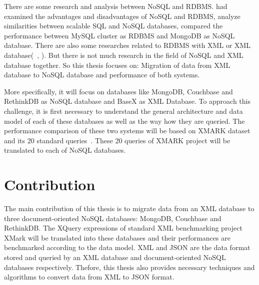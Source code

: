 	\par		
	There are some research and analysis between NoSQL and RDBMS. \citet{nance2013nosql} had examined the advantages and disadvantages of NoSQL and RDBMS, \cite{cattell2011scalable} analyze similarities between scalable SQL and NoSQL databases, \cite{hadjigeorgiou2013rdbms}  compared the performance between MySQL cluster as RDBMS and MongoDB as NoSQL database.  There are also some researches related to RDBMS with XML or XML database(~\citet{jiang2002xparent}, \citet{shanmugasundaram1999relational}). But there is not much research in the field of NoSQL and XML database together. So this thesis focuses on: Migration of data from XML database to NoSQL database and  performance of both systems.	

\par 
More specifically, it will focus on databases like MongoDB, Couchbase and RethinkDB as NoSQL database and BaseX as XML Database. To approach this challenge, it is first necessary to understand the general architecture and data model of each of these databases as well as the way how they are queried. The performance comparison of these two systems will be based on XMARK dataset and its 20 standard queries~\citep{xmark/original}. These 20 queries of XMARK project will be translated to each of NoSQL databases.
	
	\section{Contribution}
		The main contribution of this thesis is to migrate data from an XML database to three document-oriented NoSQL databases: MongoDB, Couchbase and RethinkDB. The XQuery expressions of standard XML benchmarking project XMark will be  translated  into these databases and their performances are  benchmarked according to the data model. XML and JSON are the data format stored and queried by an XML database and document-oriented NoSQL databases respectively. Thefore, this thesis also provides necessary techniques and algorithms to convert data from XML to JSON format.
	    
		
